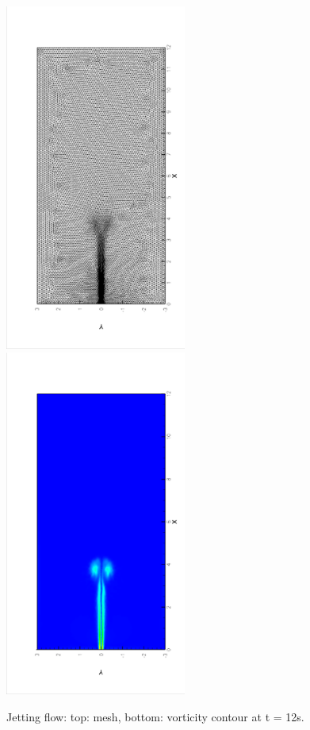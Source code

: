 \documentclass[a4paper, 11pt]{article}
\begin{document}
       \begin{figure}[!htbp]
         \begin{center}
             \includegraphics[width = 0.53\textwidth, angle = -90]{picture/jet_flow_data/mesh_t12s.eps}
             \includegraphics[width = 0.53\textwidth, angle = -90]{picture/jet_flow_data/contour_t12s.eps}
        \end{center}
        \caption{\small Jetting flow: top: mesh, bottom: vorticity contour at t = 12s.}
        \label{fig::jetting_flow_mesht12s}
       \end{figure}
\end{document}
